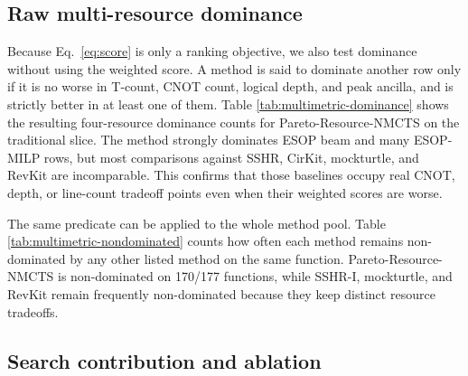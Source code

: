 \documentclass[11pt]{article}
\newcommand{\method}{Resource-NMCTS}
\begin{document}
\subsection{Raw multi-resource dominance}

Because Eq.~\eqref{eq:score} is only a ranking objective, we also test
dominance without using the weighted score.  A method is said to dominate
another row only if it is no worse in T-count, CNOT count, logical depth, and
peak ancilla, and is strictly better in at least one of them.  Table
\ref{tab:multimetric-dominance} shows the resulting four-resource dominance
counts for Pareto-\method{} on the traditional slice.  The method strongly
dominates ESOP beam and many ESOP-MILP rows, but most comparisons against
SSHR, CirKit, mockturtle, and RevKit are incomparable.  This confirms that
those baselines occupy real CNOT, depth, or line-count tradeoff points even
when their weighted scores are worse.

\begin{table}[H]
\centering
\scriptsize
\setlength{\tabcolsep}{3pt}
\renewcommand{\arraystretch}{1.06}
\caption{Raw four-resource dominance of Pareto-\method{} on $n\leq6$
functions.  Dominance uses only T-count, CNOT count, logical depth, and peak
ancilla; weighted score is not part of the predicate.}
\label{tab:multimetric-dominance}

\end{table}

The same predicate can be applied to the whole method pool.  Table
\ref{tab:multimetric-nondominated} counts how often each method remains
non-dominated by any other listed method on the same function.  Pareto-\method{}
is non-dominated on 170/177 functions, while SSHR-I, mockturtle, and RevKit
remain frequently non-dominated because they keep distinct resource tradeoffs.

\begin{table}[H]
\centering
\scriptsize
\setlength{\tabcolsep}{3pt}
\renewcommand{\arraystretch}{1.06}
\caption{Non-dominated counts in the 12-method $n\leq6$ pool.}
\label{tab:multimetric-nondominated}

\end{table}

\subsection{Search contribution and ablation}
\end{document}
